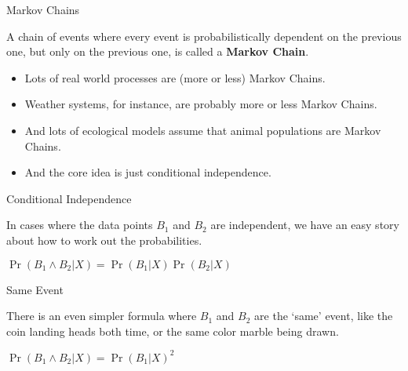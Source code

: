 \documentclass[
  ignorenonframetext,
]{beamer}
\providecommand{\tightlist}{%
  \setlength{\itemsep}{0pt}\setlength{\parskip}{0pt}}
\renewcommand{\,}{\text{, }}
\renewenvironment*{quote}	
	{\list{}{\rightmargin   \leftmargin} \item } 	
	{\endlist }
\begin{document}
\begin{frame}{Markov Chains}
\protect\hypertarget{markov-chains}{}

A chain of events where every event is probabilistically dependent on
the previous one, but only on the previous one, is called a
\textbf{Markov Chain}. \pause

\begin{itemize}
\tightlist
\item
  Lots of real world processes are (more or less) Markov Chains.
\item
  Weather systems, for instance, are probably more or less Markov
  Chains.
\item
  And lots of ecological models assume that animal populations are
  Markov Chains.
\item
  And the core idea is just conditional independence.
\end{itemize}

\end{frame}

\begin{frame}{Conditional Independence}
\protect\hypertarget{conditional-independence-1}{}

In cases where the data points \(B_1\) and \(B_2\) are independent, we
have an easy story about how to work out the probabilities.

\begin{quote}
\(\Pr(B_1 \wedge B_2 | X) = \Pr(B_1 | X)\Pr(B_2 | X)\)
\end{quote}

\end{frame}

\begin{frame}{Same Event}
\protect\hypertarget{same-event}{}

There is an even simpler formula where \(B_1\) and \(B_2\) are the
`same' event, like the coin landing heads both time, or the same color
marble being drawn.

\begin{quote}
\(\Pr(B_1 \wedge B_2 | X) = \Pr(B_1 | X)^2\)
\end{quote}

\end{frame}
\end{document}
